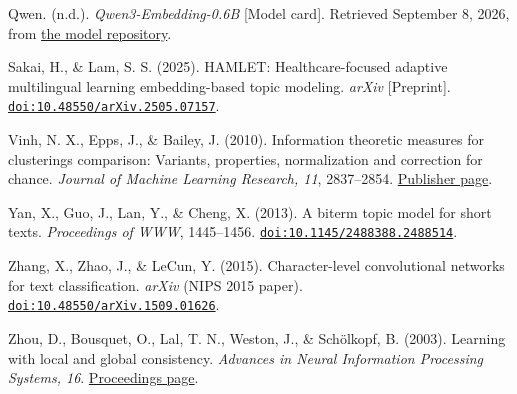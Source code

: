 \documentclass[
  11pt,
  a4paper,
]{article}
\begin{document}
Qwen. (n.d.). \emph{Qwen3-Embedding-0.6B} {[}Model card{]}. Retrieved
September 8, 2026, from
\href{https://huggingface.co/Qwen/Qwen3-Embedding-0.6B}{the model
repository}.

Sakai, H., \& Lam, S. S. (2025). HAMLET: Healthcare-focused adaptive
multilingual learning embedding-based topic modeling. \emph{arXiv}
{[}Preprint{]}.
\href{https://doi.org/10.48550/arXiv.2505.07157}{\nolinkurl{doi:10.48550/arXiv.2505.07157}}.

Vinh, N. X., Epps, J., \& Bailey, J. (2010). Information theoretic
measures for clusterings comparison: Variants, properties, normalization
and correction for chance. \emph{Journal of Machine Learning Research,
11}, 2837--2854.
\href{https://www.jmlr.org/papers/v11/vinh10a.html}{Publisher page}.

Yan, X., Guo, J., Lan, Y., \& Cheng, X. (2013). A biterm topic model for
short texts. \emph{Proceedings of WWW}, 1445--1456.
\href{https://doi.org/10.1145/2488388.2488514}{\nolinkurl{doi:10.1145/2488388.2488514}}.

Zhang, X., Zhao, J., \& LeCun, Y. (2015). Character-level convolutional
networks for text classification. \emph{arXiv} (NIPS 2015 paper).
\href{https://doi.org/10.48550/arXiv.1509.01626}{\nolinkurl{doi:10.48550/arXiv.1509.01626}}.

Zhou, D., Bousquet, O., Lal, T. N., Weston, J., \& Schölkopf, B. (2003).
Learning with local and global consistency. \emph{Advances in Neural
Information Processing Systems, 16}.
\href{https://proceedings.neurips.cc/paper_files/paper/2003/hash/87682805257e619d49b8e0dfdc14affa-Abstract.html}{Proceedings
page}.
\end{document}
